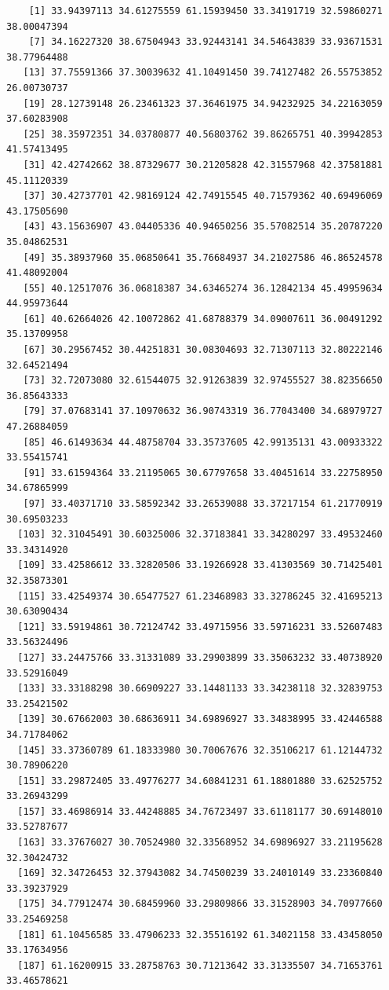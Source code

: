 \documentclass[
  letterpaper,
  DIV=11,
  numbers=noendperiod]{scrartcl}
\begin{document}
\begin{verbatim}
    [1] 33.94397113 34.61275559 61.15939450 33.34191719 32.59860271 38.00047394
    [7] 34.16227320 38.67504943 33.92443141 34.54643839 33.93671531 38.77964488
   [13] 37.75591366 37.30039632 41.10491450 39.74127482 26.55753852 26.00730737
   [19] 28.12739148 26.23461323 37.36461975 34.94232925 34.22163059 37.60283908
   [25] 38.35972351 34.03780877 40.56803762 39.86265751 40.39942853 41.57413495
   [31] 42.42742662 38.87329677 30.21205828 42.31557968 42.37581881 45.11120339
   [37] 30.42737701 42.98169124 42.74915545 40.71579362 40.69496069 43.17505690
   [43] 43.15636907 43.04405336 40.94650256 35.57082514 35.20787220 35.04862531
   [49] 35.38937960 35.06850641 35.76684937 34.21027586 46.86524578 41.48092004
   [55] 40.12517076 36.06818387 34.63465274 36.12842134 45.49959634 44.95973644
   [61] 40.62664026 42.10072862 41.68788379 34.09007611 36.00491292 35.13709958
   [67] 30.29567452 30.44251831 30.08304693 32.71307113 32.80222146 32.64521494
   [73] 32.72073080 32.61544075 32.91263839 32.97455527 38.82356650 36.85643333
   [79] 37.07683141 37.10970632 36.90743319 36.77043400 34.68979727 47.26884059
   [85] 46.61493634 44.48758704 33.35737605 42.99135131 43.00933322 33.55415741
   [91] 33.61594364 33.21195065 30.67797658 33.40451614 33.22758950 34.67865999
   [97] 33.40371710 33.58592342 33.26539088 33.37217154 61.21770919 30.69503233
  [103] 32.31045491 30.60325006 32.37183841 33.34280297 33.49532460 33.34314920
  [109] 33.42586612 33.32820506 33.19266928 33.41303569 30.71425401 32.35873301
  [115] 33.42549374 30.65477527 61.23468983 33.32786245 32.41695213 30.63090434
  [121] 33.59194861 30.72124742 33.49715956 33.59716231 33.52607483 33.56324496
  [127] 33.24475766 33.31331089 33.29903899 33.35063232 33.40738920 33.52916049
  [133] 33.33188298 30.66909227 33.14481133 33.34238118 32.32839753 33.25421502
  [139] 30.67662003 30.68636911 34.69896927 33.34838995 33.42446588 34.71784062
  [145] 33.37360789 61.18333980 30.70067676 32.35106217 61.12144732 30.78906220
  [151] 33.29872405 33.49776277 34.60841231 61.18801880 33.62525752 33.26943299
  [157] 33.46986914 33.44248885 34.76723497 33.61181177 30.69148010 33.52787677
  [163] 33.37676027 30.70524980 32.33568952 34.69896927 33.21195628 32.30424732
  [169] 32.34726453 32.37943082 34.74500239 33.24010149 33.23360840 33.39237929
  [175] 34.77912474 30.68459960 33.29809866 33.31528903 34.70977660 33.25469258
  [181] 61.10456585 33.47906233 32.35516192 61.34021158 33.43458050 33.17634956
  [187] 61.16200915 33.28758763 30.71213642 33.31335507 34.71653761 33.46578621

\end{verbatim}
\end{document}
